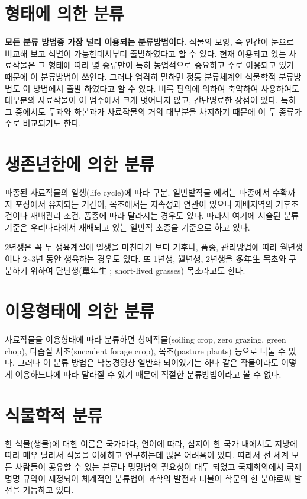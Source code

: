 \documentclass[]{book}
\begin{document}
\section{형태에 의한 분류}\label{--}

\textbf{모든 분류 방법중 가장 널리 이용되는 분류방법이다.} 식물의 모양,
즉 인간이 눈으로 비교해 보고 식별이 가능한데서부터 출발하였다고 할 수
있다. 현재 이용되고 있는 사료작물은 그 형태에 따라 몇 종류만이 특히
농업적으로 중요하고 주로 이용되고 있기 때문에 이 분류방법이 쓰인다.
그러나 엄격히 말하면 정통 분류체계인 식물학적 분류방법도 이 방법에서
출발 하였다고 할 수 있다. 비록 편의에 의하여 축약하여 사용하여도
대부분의 사료작물이 이 범주에서 크게 벗어나지 않고, 간단명료한 장점이
있다. 특히 그 중에서도 두과와 화본과가 사료작물의 거의 대부분을 차지하기
때문에 이 두 종류가 주로 비교되기도 한다.

\section{생존년한에 의한 분류}\label{--}

파종된 사료작물의 일생(life cycle)에 따라 구분. 일반밭작물 에서는
파종에서 수확까지 포장에서 유지되는 기간이, 목초에서는 지속성과 연관이
있으나 재배지역의 기후조건이나 재배관리 조건, 품종에 따라 달라지는
경우도 있다. 따라서 여기에 서술된 분류기준은 우리나라에서 재배되고 있는
일반적 초종을 기준으로 하고 있다.

2년생은 꼭 두 생육계절에 일생을 마친다기 보다 기후나, 품종, 관리방법에
따라 월년생이나 2\textasciitilde{}3년 동안 생육하는 경우도 있다. 또
1년생, 월년생, 2년생을 多年生 목초와 구분하기 위하여 단년생(單年生 ;
short-lived grasses) 목초라고도 한다.

\section{이용형태에 의한 분류}\label{--}

사료작물을 이용형태에 따라 분류하면 청예작물(soiling crop, zero grazing,
green chop), 다즙질 사초(succulent forage crop), 목초(pasture plants)
등으로 나눌 수 있다. 그러나 이 분류 방법은 낙농경영상 일반화 되어있기는
하나 같은 작물이라도 어떻게 이용하느냐에 따라 달라질 수 있기 때문에
적절한 분류방법이라고 볼 수 없다.

\section{식물학적 분류}\label{-}

한 식물(생물)에 대한 이름은 국가마다, 언어에 따라, 심지어 한 국가
내에서도 지방에 따라 매우 달라서 식물을 이해하고 연구하는데 많은
어려움이 있다. 따라서 전 세계 모든 사람들이 공유할 수 있는 분류나
명명법의 필요성이 대두 되었고 국제회의에서 국제 명명 규약이 제정되어
체계적인 분류법이 과학의 발전과 더불어 학문의 한 분야로써 발전을
거듭하고 있다.
\end{document}
